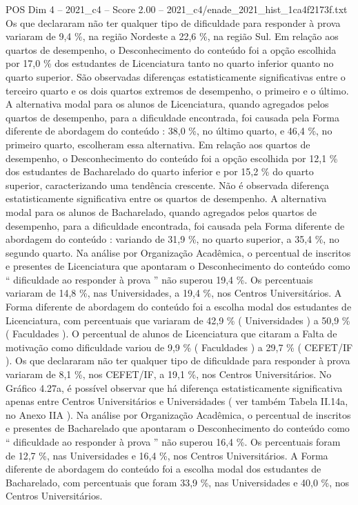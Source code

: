 \begin{textsample}{POS Dim 4 – 2021\_c4 – Score 2.00 – 2021\_c4/enade\_2021\_hist\_1ca4f2173f.txt}
Os que declararam não ter qualquer tipo de dificuldade para responder à prova variaram de 9,4 \%, na região Nordeste a 22,6 \%, na região Sul.
Em relação aos quartos de desempenho, o Desconhecimento do conteúdo foi a opção escolhida por 17,0 \% dos estudantes de Licenciatura tanto no quarto inferior quanto no quarto superior.
São observadas diferenças estatisticamente significativas entre o terceiro quarto e os dois quartos extremos de desempenho, o primeiro e o último.
A alternativa modal para os alunos de Licenciatura, quando agregados pelos quartos de desempenho, para a dificuldade encontrada, foi causada pela Forma diferente de abordagem do conteúdo : 38,0 \%, no último quarto, e 46,4 \%, no primeiro quarto, escolheram essa alternativa.
Em relação aos quartos de desempenho, o Desconhecimento do conteúdo foi a opção escolhida por 12,1 \% dos estudantes de Bacharelado do quarto inferior e por 15,2 \% do quarto superior, caracterizando uma tendência crescente.
Não é observada diferença estatisticamente significativa entre os quartos de desempenho.
A alternativa modal para os alunos de Bacharelado, quando agregados pelos quartos de desempenho, para a dificuldade encontrada, foi causada pela Forma diferente de abordagem do conteúdo : variando de 31,9 \%, no quarto superior, a 35,4 \%, no segundo quarto.
Na análise por Organização Acadêmica, o percentual de inscritos e presentes de Licenciatura que apontaram o Desconhecimento do conteúdo como “ dificuldade ao responder à prova ” não superou 19,4 \%.
Os percentuais variaram de 14,8 \%, nas Universidades, a 19,4 \%, nos Centros Universitários.
A Forma diferente de abordagem do conteúdo foi a escolha modal dos estudantes de Licenciatura, com percentuais que variaram de 42,9 \% ( Universidades ) a 50,9 \% ( Faculdades ).
O percentual de alunos de Licenciatura que citaram a Falta de motivação como dificuldade variou de 9,9 \% ( Faculdades ) a 29,7 \% ( CEFET/IF ).
Os que declararam não ter qualquer tipo de dificuldade para responder à prova variaram de 8,1 \%, nos CEFET/IF, a 19,1 \%, nos Centros Universitários.
No Gráfico 4.27a, é possível observar que há diferença estatisticamente significativa apenas entre Centros Universitários e Universidades ( ver também Tabela II.14a, no Anexo IIA ).
Na análise por Organização Acadêmica, o percentual de inscritos e presentes de Bacharelado que apontaram o Desconhecimento do conteúdo como “ dificuldade ao responder à prova ” não superou 16,4 \%.
Os percentuais foram de 12,7 \%, nas Universidades e 16,4 \%, nos Centros Universitários.
A Forma diferente de abordagem do conteúdo foi a escolha modal dos estudantes de Bacharelado, com percentuais que foram 33,9 \%, nas Universidades e 40,0 \%, nos Centros Universitários.

\end{textsample}
